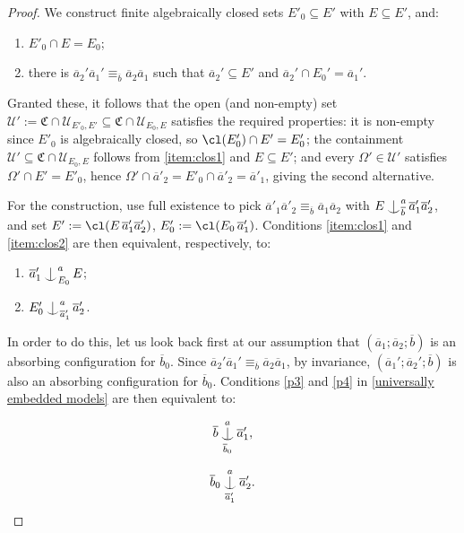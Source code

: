\documentclass{article}
\theoremstyle{remark}
\theoremstyle{definition}
\newcommand{\U}[0]{\mathbb{U}}
\renewcommand{\U}[0]{\mathcal{U}}
\def\Ind#1#2{#1\setbox0=\hbox{$#1x$}\kern\wd0\hbox to 0pt{\hss$#1\mid$\hss}
	\lower.9\ht0\hbox to 0pt{\hss$#1\smile$\hss}\kern\wd0}
\def\ind{\mathop{\mathpalette\Ind{}}}
\begin{document}
{{{{{\begin{proof}
     We  construct finite algebraically closed sets $E'_{0}\subseteq E'$ with $E\subseteq E'$, and:
     
     \begin{enumerate}[label=(\roman*)]
     	\item\label{item:clos1} $E'_{0}\cap E=E_{0}$;
     	\item\label{item:clos2} there is $\overline{a}_2'\overline{a}_1'\equiv_{\overline{b}} \overline{a}_2\overline{a}_1$ such that $\overline{a}_2'\subseteq E'$ and $\overline{a}_2'\cap E_0'=\overline{a}_1'$.
     \end{enumerate}
    Granted these, it follows that the open (and non-empty) set  $\U':=\mathfrak{C}\cap\U_{E'_{0},E'}\subseteq\mathfrak{C}\cap\U_{E_{0},E}$ satisfies the required properties: { it
  is non-empty since $E'_0$ is algebraically closed, so
  $\cl(E'_0) \cap E' = E'_0$; the containment
  $\U' \subseteq \mathfrak{C} \cap \U_{E_0, E}$ follows from
  \ref{item:clos1} and $E \subseteq E'$; and every $\Omega' \in \U'$ satisfies   $\Omega' \cap E' = E'_0$, hence
  $\Omega' \cap \overline{a}'_2 = E'_0 \cap \overline{a}'_2 =  \overline{a}'_1$, giving the second alternative.}
    
 For the construction, use full existence to pick
  $\overline{a}'_1 \overline{a}'_2 \equiv_{\overline{b}}
  \overline{a}_1 \overline{a}_2$ with
  $E \ind^{a}_{\overline{b}} \overline{a}'_1 \overline{a}'_2$, and set
  $E' := \cl(E\, \overline{a}'_1 \overline{a}'_2)$,
  $E'_0 := \cl(E_0\, \overline{a}'_1)$. Conditions \ref{item:clos1} and
  \ref{item:clos2} are then equivalent, respectively, to:
   \begin{enumerate}[label=(\roman*$^\star$)]
    	\item \label{item1} $\overline{a}_1'\ind^{a}_{E_0} E$;
    	\item \label{item2} $E_0'\ind^{a}_{\overline{a}_1'} \overline{a}_2'$. 
    \end{enumerate}


   In order to do this, let us look back first at our assumption that $(\overline{a}_1; \overline{a}_2; \overline{b})$ is an absorbing configuration for $\overline{b}_0$. Since $\overline{a}_2'\overline{a}_1'\equiv_{\overline{b}} \overline{a}_2 \overline{a}_1$, by invariance, $(\overline{a}_1'; \overline{a}_2'; \overline{b})$ is also an absorbing configuration for $\overline{b}_0$.
    Conditions \ref{p3} and \ref{p4} in \cref{universally embedded models} are then equivalent to:
     
     \begin{minipage}{.48\linewidth} %
    	\begin{equation}\label{cons1}
    	\overline{b}\ind^{a}_{\overline{b}_{0}}\overline{a}_1',
    	\end{equation}
    \end{minipage}%
    \hfill %
    \begin{minipage}{.48\linewidth} %
\begin{equation}\label{cons2}
    	\overline{b}_{0}\ind^{a}_{\overline{a}_1'}\overline{a}_2'.
    	\end{equation}
    \end{minipage}	
      

\end{proof}}}}}}
\end{document}
